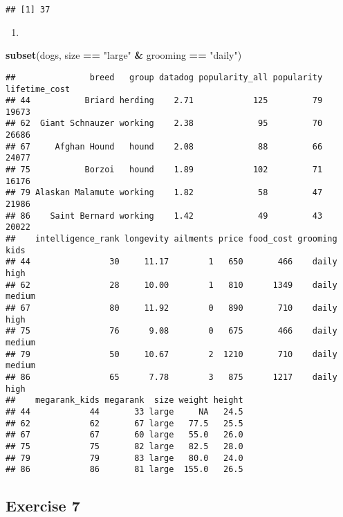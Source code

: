 \documentclass[
]{article}
\newenvironment{Shaded}{\begin{snugshade}}{\end{snugshade}}
\newcommand{\KeywordTok}[1]{\textcolor[rgb]{0.13,0.29,0.53}{\textbf{#1}}}
\newcommand{\NormalTok}[1]{#1}
\newcommand{\OperatorTok}[1]{\textcolor[rgb]{0.81,0.36,0.00}{\textbf{#1}}}
\newcommand{\StringTok}[1]{\textcolor[rgb]{0.31,0.60,0.02}{#1}}
\providecommand{\tightlist}{%
  \setlength{\itemsep}{0pt}\setlength{\parskip}{0pt}}
\begin{document}
\begin{verbatim}
## [1] 37
\end{verbatim}

\begin{enumerate}
\def\labelenumi{\arabic{enumi}.}
\setcounter{enumi}{3}
\tightlist
\item
\end{enumerate}

\begin{Shaded}
\begin{Highlighting}[]
\KeywordTok{subset}\NormalTok{(dogs, size }\OperatorTok{==}\StringTok{ "large"} \OperatorTok{\&}\StringTok{ }\NormalTok{grooming }\OperatorTok{==}\StringTok{ "daily"}\NormalTok{)}
\end{Highlighting}
\end{Shaded}

\begin{verbatim}
##               breed   group datadog popularity_all popularity lifetime_cost
## 44           Briard herding    2.71            125         79         19673
## 62  Giant Schnauzer working    2.38             95         70         26686
## 67     Afghan Hound   hound    2.08             88         66         24077
## 75           Borzoi   hound    1.89            102         71         16176
## 79 Alaskan Malamute working    1.82             58         47         21986
## 86    Saint Bernard working    1.42             49         43         20022
##    intelligence_rank longevity ailments price food_cost grooming   kids
## 44                30     11.17        1   650       466    daily   high
## 62                28     10.00        1   810      1349    daily medium
## 67                80     11.92        0   890       710    daily   high
## 75                76      9.08        0   675       466    daily medium
## 79                50     10.67        2  1210       710    daily medium
## 86                65      7.78        3   875      1217    daily   high
##    megarank_kids megarank  size weight height
## 44            44       33 large     NA   24.5
## 62            62       67 large   77.5   25.5
## 67            67       60 large   55.0   26.0
## 75            75       82 large   82.5   28.0
## 79            79       83 large   80.0   24.0
## 86            86       81 large  155.0   26.5
\end{verbatim}

\hypertarget{exercise-7}{%
\subsection{Exercise 7}\label{exercise-7}}
\end{document}
